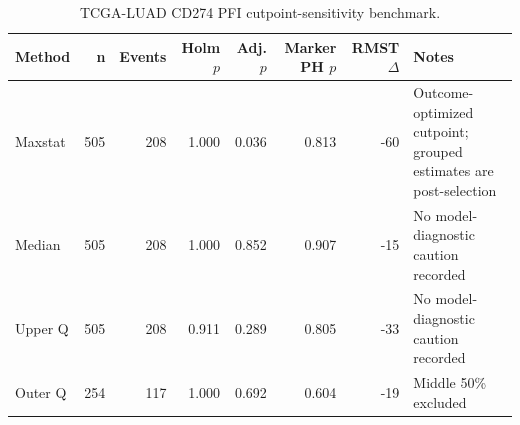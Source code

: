 \begin{table}[t]
\centering
\caption{TCGA-LUAD CD274 PFI cutpoint-sensitivity benchmark.}
\label{tab:luad-cd274-pfi-cutpoints}
\begin{tabular}{lrrrrrrl}
\toprule
Method & n & Events & Holm $p$ & Adj. $p$ & Marker PH $p$ & RMST $\Delta$ & Notes \\
\midrule
Maxstat & 505 & 208 & 1.000 & 0.036 & 0.813 & -60 & Outcome-optimized cutpoint; grouped estimates are post-selection \\
Median & 505 & 208 & 1.000 & 0.852 & 0.907 & -15 & No model-diagnostic caution recorded \\
Upper Q & 505 & 208 & 0.911 & 0.289 & 0.805 & -33 & No model-diagnostic caution recorded \\
Outer Q & 254 & 117 & 1.000 & 0.692 & 0.604 & -19 & Middle 50\% excluded \\
\bottomrule
\end{tabular}
\end{table}
